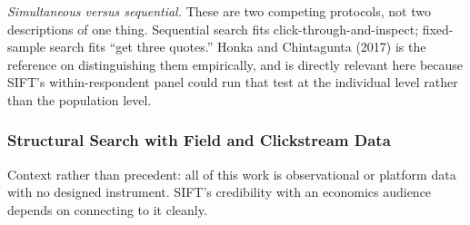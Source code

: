 \documentclass[
  letterpaper,
  DIV=11,
  numbers=noendperiod]{scrartcl}
\begin{document}
\emph{Simultaneous versus sequential.} These are two competing
protocols, not two descriptions of one thing. Sequential search fits
click-through-and-inspect; fixed-sample search fits ``get three
quotes.'' Honka and Chintagunta (2017) is the reference on
distinguishing them empirically, and is directly relevant here because
SIFT's within-respondent panel could run that test at the individual
level rather than the population level.

\subsubsection{Structural Search with Field and Clickstream
Data}\label{sec-applit-field}

Context rather than precedent: all of this work is observational or
platform data with no designed instrument. SIFT's credibility with an
economics audience depends on connecting to it cleanly.
\end{document}
